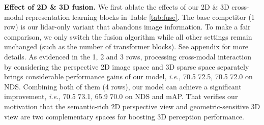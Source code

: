 \documentclass[10pt,twocolumn,letterpaper]{article}
\begin{document}
\noindent \textbf{Effect of 2D \& 3D fusion.} We first ablate the effects of our 2D \& 3D cross-modal representation learning blocks in Table \ref{tab:fuse}. The base competitor (1 row) is our lidar-only variant that abandons image information. To make a fair comparison, we only switch  the fusion algorithm while all other settings remain unchanged (such as the number of transformer blocks). See appendix for more details. As evidenced in the 1, 2 and 3 rows, processing cross-modal interaction by considering the perspective 2D image space and 3D sparse space separately brings considerable performance gains of our model, \emph{i.e.}, 70.5  72.5, 70.5  72.0 on NDS. Combining both of them (4 rows), our model can achieve a significant improvement, \emph{i.e.}, 70.5  73.1, 65.9  70.0 on NDS and mAP. That verifies our motivation that the semantic-rich 2D perspective view and geometric-sensitive 3D view are two complementary spaces for boosting 3D perception performance. 
\end{document}
